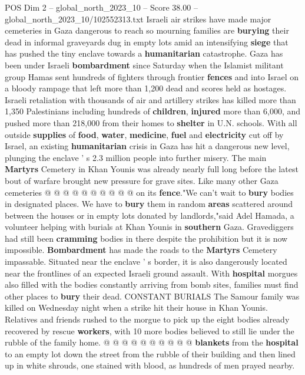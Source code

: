 \begin{textsample}{POS Dim 2 – global\_north\_2023\_10 – Score 38.00 – global\_north\_2023\_10/102552313.txt}  \label{ex:f2_pos_283}
Israeli air strikes have made major cemeteries in Gaza dangerous to reach so mourning families are \textbf{burying} their dead in informal graveyards dug in empty lots amid an intensifying \textbf{siege} that has pushed the tiny enclave towards a \textbf{humanitarian} catastrophe.
Gaza has been under Israeli \textbf{bombardment} since Saturday when the Islamist militant group Hamas sent hundreds of fighters through frontier \textbf{fences} and into Israel on a bloody rampage that left more than 1,200 dead and scores held as hostages.
Israeli retaliation with thousands of air and artillery strikes has killed more than 1,350 Palestinians including hundreds of \textbf{children}, \textbf{injured} more than 6,000, and pushed more than 218,000 from their homes to \textbf{shelter} in U.N. schools.
With all outside \textbf{supplies} of \textbf{food}, \textbf{water}, \textbf{medicine}, \textbf{fuel} and \textbf{electricity} cut off by Israel, an existing \textbf{humanitarian} crisis in Gaza has hit a dangerous new level, plunging the enclave ' s 2.3 million people into further misery.
The main \textbf{Martyrs} Cemetery in Khan Younis was already nearly full long before the latest bout of warfare brought new pressure for grave sites.
Like many other Gaza cemeteries @ @ @ @ @ @ @ @ @ @ on its \textbf{fence}."We can't wait to \textbf{bury} bodies in designated places.
We have to \textbf{bury} them in random \textbf{areas} scattered around between the houses or in empty lots donated by landlords,"said Adel Hamada, a volunteer helping with burials at Khan Younis in \textbf{southern} Gaza.
Gravediggers had still been \textbf{cramming} bodies in there despite the prohibition but it is now impossible. \textbf{Bombardment} has made the roads to the \textbf{Martyrs} Cemetery impassable.
Situated near the enclave ' s border, it is also dangerously located near the frontlines of an expected Israeli ground assault.
With \textbf{hospital} morgues also filled with the bodies constantly arriving from bomb sites, families must find other places to \textbf{bury} their dead.
CONSTANT BURIALS The Samour family was killed on Wednesday night when a strike hit their house in Khan Younis.
Relatives and friends rushed to the morgue to pick up the eight bodies already recovered by rescue \textbf{workers}, with 10 more bodies believed to still lie under the rubble of the family home. @ @ @ @ @ @ @ @ @ @ \textbf{blankets} from the \textbf{hospital} to an empty lot down the street from the rubble of their building and then lined up in white shrouds, one stained with blood, as hundreds of men prayed nearby.

\end{textsample}
